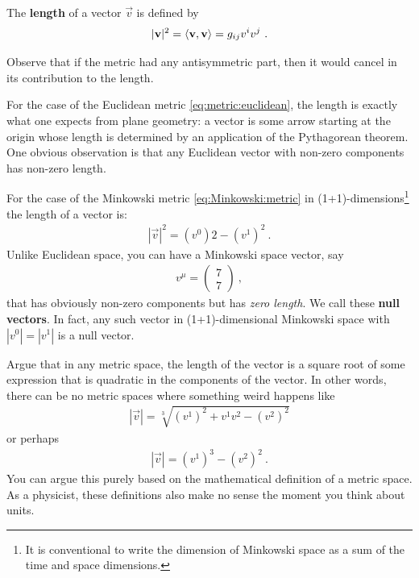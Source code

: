 \documentclass[12pt, oneside]{report}    %
\begin{document}
The \textbf{length} of a vector $\vec{v}$ is defined by
\begin{align}
 |\mathbf{v}|^2  
 = \langle \mathbf{v},\mathbf{v} \rangle 
 = g_{ij}v^iv^j
 \ .
 \label{eq:lenght:in:terms:of:metric}
\end{align}

\begin{exercise}
Observe that if the metric had any antisymmetric part, then it would cancel in its contribution to the length. 
\end{exercise}

\begin{example}
For the case of the Euclidean metric \eqref{eq:metric:euclidean}, the length is exactly what one expects from plane geometry: a vector is some arrow starting at the origin whose length is determined by an application of the Pythagorean theorem. One obvious observation is that any Euclidean vector with non-zero components has non-zero length.
\end{example}

\begin{example}
For the case of the Minkowski metric \eqref{eq:Minkowski:metric} in (1+1)-dimensions\footnote{It is conventional to write the dimension of Minkowski space as a sum of the time and space dimensions.} the length of a vector is:
\begin{align}
    |\vec{v}|^2 = (v^0)2 - (v^1)^2 \ .
\end{align}
Unlike Euclidean space, you can have a Minkowski space vector, say 
\begin{align}
    v^\mu = 
    \begin{pmatrix}
        7\\
        7
    \end{pmatrix} \ ,
\end{align}
that has obviously non-zero components but has \emph{zero length}. We call these \textbf{null vectors}. In fact, any such vector in (1+1)-dimensional Minkowski space with $|v^0| = |v^1|$ is a null vector.
\end{example}

\begin{exercise}
Argue that in any metric space, the length of the vector is a square root of some expression that is quadratic in the components of the vector. In other words, there can be no metric spaces where something weird happens like
\begin{align}
    |\vec{v}| = \sqrt[3]{(v^1)^2 + v^1v^2 - (v^2)^2}
\end{align}
or perhaps
\begin{align}
    |\vec{v}| = (v^1)^3 - (v^2)^2 \ .
\end{align}
You can argue this purely based on the mathematical definition of a metric space. As a physicist, these definitions also make no sense the moment you think about units.
\end{exercise}
\end{document}

